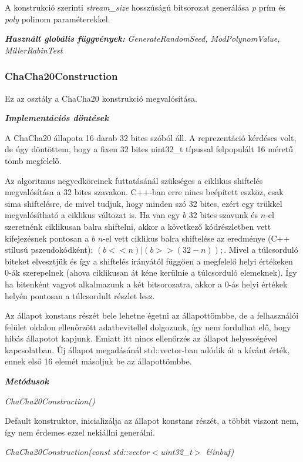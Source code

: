 \documentclass[hidelinks, 12pt]{article}
\begin{document}
A konstrukció szerinti \textit{stream\_size} hosszúságú bitsorozat generálása \textit{p} prím és \textit{poly} polinom paraméterekkel.

\textbf{\textit{Használt globális függvények: }}\textit{GenerateRandomSeed, ModPolynomValue, MillerRabinTest}

\subsubsection*{ChaCha20Construction}
Ez az osztály a ChaCha20 konstrukció megvalósítása.

\textbf{\textit{Implementációs döntések}}

A ChaCha20 állapota 16 darab 32 bites szóból áll. A reprezentáció kérdéses volt, de úgy döntöttem, hogy a fixen 32 bites uint32\_t típussal felpopulált 16 méretű tömb megfelelő.

Az algoritmus negyedköreinek futtatásánál szükséges a ciklikus shiftelés megvalósítása a 32 bites szavakon. C++-ban erre nincs beépített eszköz, csak sima shiftelésre, de mivel tudjuk, hogy minden szó 32 bites, ezért egy trükkel megvalósítható a ciklikus változat is. Ha van egy $b$ 32 bites szavunk és $n$-el szeretnénk ciklikusan balra shiftelni, akkor a következő kódrészletben vett kifejezésnek pontosan a $b$ $n$-el vett ciklikus balra shiftelése az eredménye (C++ stílusú pszeudokódként): $(b << n) | (b >> (32-n));$. Mivel a túlcsorduló biteket elvesztjük és így a shiftelés irányától függően a megfelelő helyi értékeken 0-ák szerepelnek (ahova ciklikusan át kéne kerülnie a túlcsorduló elemeknek). Így ha bitenként vagyot alkalmazunk a két bitsorozatra, akkor a 0-ás helyi értékek helyén pontosan a túlcsordult részlet lesz.

Az állapot konstans részét bele lehetne égetni az állapottömbbe, de a felhasználói felület oldalon ellenőrzött adatbevitellel dolgozunk, így nem fordulhat elő, hogy hibás állapotot kapjunk. Emiatt itt nincs ellenőrzés az állapot helyességével kapcsolatban. Új állapot megadásánál std::vector-ban adódik át a kívánt érték, ennek első 16 elemét másoljuk be az állapottömbbe.

\textbf{\textit{Metódusok}}

\textit{ChaCha20Construction()}

Default konstruktor, inicializálja az állapot konstans részét, a többit viszont nem, így nem érdemes ezzel nekiállni generálni.

\textit{ChaCha20Construction(const std::vector$<$uint32\_t$>$ \&inbuf)}
\end{document}
